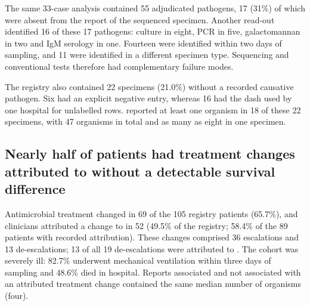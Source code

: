 The same 33-case analysis contained 55 adjudicated pathogens, 17 (31\%) of which were absent from the \mngs report of the sequenced specimen. Another read-out identified 16 of these 17 pathogens: culture in eight, PCR in five, galactomannan in two and IgM serology in one. Fourteen were identified within two days of \mngs sampling, and 11 were identified in a different specimen type. Sequencing and conventional tests therefore had complementary failure modes.

The registry also contained 22 specimens (21.0\%) without a recorded causative pathogen. Six had an explicit negative entry, whereas 16 had the dash used by one hospital for unlabelled rows. \mngs reported at least one organism in 18 of these 22 specimens, with 47 organisms in total and as many as eight in one specimen. 

\subsection*{Nearly half of patients had treatment changes attributed to \mngs without a detectable survival difference}

Antimicrobial treatment changed in 69 of the 105 registry patients (65.7\%), and clinicians attributed a change to \mngs in 52 (49.5\% of the registry; 58.4\% of the 89 patients with recorded attribution). These changes comprised 36 escalations and 13 de-escalations; 13 of all 19 de-escalations were attributed to \mngs. The cohort was severely ill: 82.7\% underwent mechanical ventilation within three days of sampling and 48.6\% died in hospital. Reports associated and not associated with an attributed treatment change contained the same median number of organisms (four).

